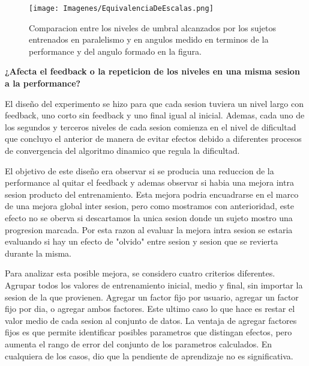 \documentclass{article}
\begin{document}
\begin{figure}
        \centering
        \texttt{[image: Imagenes/EquivalenciaDeEscalas.png]}
        \caption{Comparacion entre los niveles de umbral alcanzados por los sujetos entrenados en paralelismo y en angulos medido en terminos de la performance y del angulo formado en la figura.}
        \label{fig:equivalencia}
\end{figure}

\textbf{¿Afecta el feedback o la repeticion de los niveles en una misma sesion a la performance?}

El diseño del experimento se hizo para que cada sesion tuviera un nivel largo con feedback, uno corto sin feedback y uno final igual al inicial. Ademas, cada uno de los segundos y terceros niveles de cada sesion comienza en el nivel de dificultad que concluyo el anterior de manera de evitar efectos debido a diferentes procesos de convergencia del algoritmo dinamico que regula la dificultad. 

El objetivo de este diseño era observar si se producia una reduccion de la performance al quitar el feedback y ademas observar si habia una mejora intra sesion producto del entrenamiento. Esta mejora podria encuadrarse en el marco de una mejora global inter sesion, pero como mostramos con anterioridad, este efecto no se oberva si descartamos la unica sesion donde un sujeto mostro una progresion marcada. Por esta razon al evaluar la mejora intra sesion se estaria evaluando si hay un efecto de "olvido" entre sesion y sesion que se revierta durante la misma. 

Para analizar esta posible mejora, se considero cuatro criterios diferentes. Agrupar todos los valores de entrenamiento inicial, medio y final, sin importar la sesion de la que provienen. Agregar un factor fijo por usuario, agregar un factor fijo por dia, o agregar ambos factores. Este ultimo caso lo que hace es restar el valor medio de cada sesion al conjunto de datos. La ventaja de agregar factores fijos es que permite identificar posibles parametros que distingan efectos, pero aumenta el rango de error del conjunto de los parametros calculados. En cualquiera de los casos, dio que la pendiente de aprendizaje no es significativa. 
\end{document}
